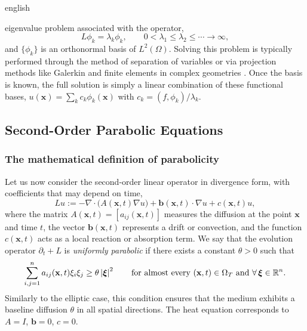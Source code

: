\documentclass[0000.tex]{subfiles}
\begin{document}
\begin{hyphenrules}{english}
\begin{enumerate}
    eigenvalue problem associated with the operator,
    \begin{equation}
      L\phi_k=\lambda_k\phi_k,\qquad 0<\lambda_1\le\lambda_2\le\cdots\to\infty,
      \label{eq:eigen}
    \end{equation}
    and $\{\phi_k\}$ is an orthonormal basis of $L^2(\Omega)$. Solving this problem is typically
    performed through the method of separation of variables \cite{evans2010} or via projection
    methods like Galerkin and finite elements in complex geometries \cite{zienkiewicz2013}. Once
    the basis is known, the full solution is simply a linear combination of these functional bases,
    $u(\mathbf{x})=\sum_k c_k\phi_k(\mathbf{x})$ with $c_k=(f,\phi_k)/\lambda_k$.
\end{enumerate}

\subsection{Second-Order Parabolic Equations}\label{subsec:parabolic}

\subsubsection{The mathematical definition of parabolicity}
Let us now consider the second-order linear operator in divergence form, with coefficients that may
depend on time,
\begin{equation}
  Lu:=-\nabla\cdot\big(A(\mathbf{x},t)\nabla u\big)+\mathbf{b}(\mathbf{x},t)\cdot\nabla u+c(\mathbf{x},t)u,
  \label{eq:parabolic-op}
\end{equation}
where the matrix $A(\mathbf{x},t)=[a_{ij}(\mathbf{x},t)]$ measures the diffusion at the point $\mathbf{x}$ and time $t$, the
vector $\mathbf{b}(\mathbf{x},t)$ represents a drift or convection, and the function $c(\mathbf{x},t)$ acts as a local reaction
or absorption term. We say that the evolution operator $\partial_t+L$ is \emph{uniformly parabolic} if
there exists a constant $\theta>0$ such that
\begin{equation}
  \sum_{i,j=1}^{n}a_{ij}(\mathbf{x},t)\xi_i\xi_j\ge\theta\left\lvert \bm\xi \right\rvert^2\qquad
  \text{for almost every }(\mathbf{x},t)\in\Omega_T\text{ and }\forall\,\bm\xi\in\mathbb{R}^n.
  \label{eq:uniform-parabolicity}
\end{equation}
Similarly to the elliptic case, this condition ensures that the medium exhibits a baseline diffusion
$\theta$ in all spatial directions. The heat equation corresponds to $A=I$, $\mathbf{b}=0$, $c=0$.


\end{hyphenrules}
\end{document}
